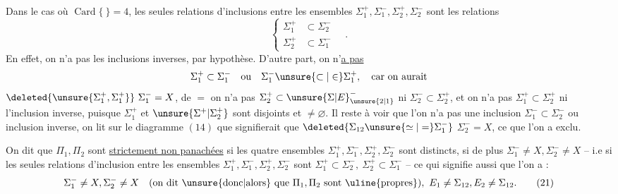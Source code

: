 \begingroup\makeatletter\tagsleft@true\makeatother
\uline{} Dans le cas où $\operatorname{Card}\{\ \}=4$,  les seules relations d'inclusions entre les ensembles $\Sigma_1^+,\Sigma_1^-,\Sigma_2^+,\Sigma_2^-$ sont les relations
\[
\left\{\begin{aligned}
\Sigma_1^+&\subset\Sigma_2^-\\
\Sigma_2^+&\subset\Sigma_1^-
\end{aligned}\right. \quad .
\tag*{($*$)}
\]
En effet, on n'a pas les inclusions inverses, par hypothèse. D'autre part, on n'\uline{a pas}
\[
\Sigma_1^+\subset\Sigma_1^- \quad\text{ou}\quad \Sigma_1^-\unsure{\subset|\in}\Sigma_1^+,\quad\text{car on aurait}
\]
$\deleted{\unsure{\Sigma_1^+,\Sigma_1^+}}\ \Sigma_1^-=X$, de $=$ on n'a pas $\Sigma_2^+\subset{\unsure{\Sigma|E}}_{\unsure{2|1}}^-$ ni $\Sigma_2^-\subset\Sigma_2^+$, et on n'a pas $\Sigma_1^+\subset\Sigma_2^+$ ni l'inclusion inverse, puisque $\Sigma_1^+$ et $\unsure{\Sigma^+|\Sigma_2^+}$ sont disjoints et $\ne\varnothing$. Il reste à voir que l'on n'a pas une inclusion $\Sigma_1^-\subset\Sigma_2^-$ ou inclusion inverse, on lit sur le diagramme $(14)$ que   signifierait que $\deleted{\Sigma_{12}\unsure{\simeq|=}\Sigma_1^-}$  $\Sigma_2^-=X$, ce que l'on a exclu.

\noindent\makebox[0pt][r]{\rule[-9ex]{.4pt}{10.5ex}\hspace{.55em}}\uline{} On dit que $\Pi_1,\Pi_2$ sont \uline{strictement non panachées}  si les quatre ensembles $\Sigma_1^+,\Sigma_1^-,\Sigma_2^+,\Sigma_2^-$ sont distincts,  si  de plus $\Sigma_1^-\ne X,\Sigma_2^-\ne X$ -- i.e si les seules relations d'inclusion entre les ensembles $\Sigma_1^+,\Sigma_1^-,\Sigma_2^+,\Sigma_2^-$ sont $\Sigma_1^+\subset\Sigma_2^-,\ \Sigma_2^+\subset\Sigma_1^-$ -- ce qui signifie aussi que l'on a :
\[
\Sigma_1^-\ne X,\Sigma_2^-\ne X
\quad(\text{on dit \unsure{donc|alors} que }\Pi_1,\Pi_2\text{ sont \uline{propres}}),
\ E_1\ne\Sigma_{12},E_2\ne\Sigma_{12}.
\tag*{(21)}
\]

\endgroup
\clearpage
